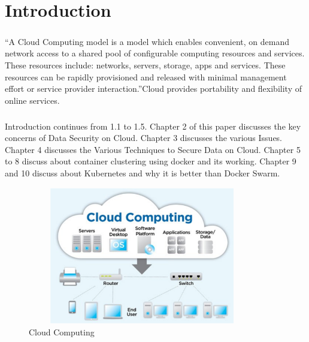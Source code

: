 \chapter{Introduction}

\paragraph{\hspace{24pt}}
“A Cloud Computing model is a model which enables convenient, on demand network access to a shared pool of configurable computing resources and services. These resources include: networks, servers, storage, apps and services. These resources can be rapidly provisioned and released with minimal management effort or service provider interaction.”Cloud provides portability and flexibility of online services.

\paragraph{\hspace{24pt}}Introduction continues from 1.1 to 1.5. Chapter 2 of this paper discusses the key concerns of Data Security on Cloud. Chapter 3 discusses the various Issues. Chapter 4 discusses the Various Techniques to Secure Data on Cloud. Chapter 5 to 8 discuss about container clustering using docker and its working. Chapter 9 and 10 discuss about Kubernetes and why it is better than Docker Swarm.

\begin{figure}[htb]
\centering
\includegraphics[width=10cm,height=6cm]{5-contents/1-Introduction/images/cloud-computing-intro.png} %
\caption{Cloud Computing}
\label{fig:label} %
\end{figure}

